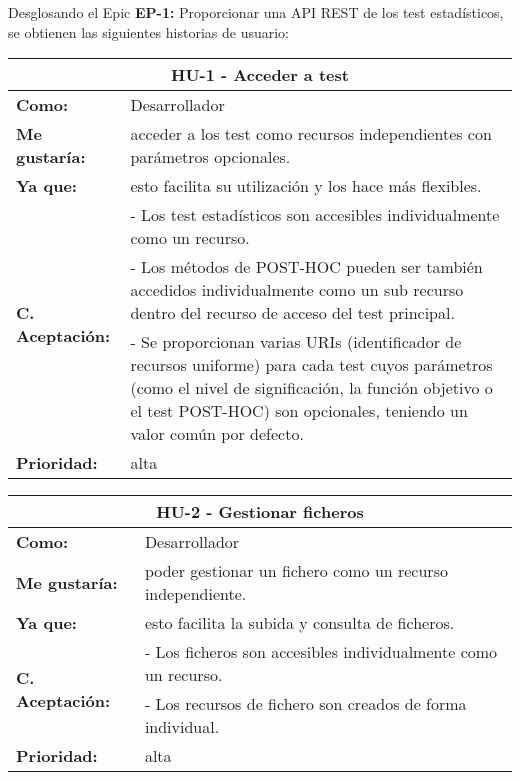 Desglosando el Epic \textbf{EP-1:} Proporcionar una API REST de los test estadísticos, se obtienen las siguientes historias de usuario:

\begin{table}[H]
	\begin{tabular}{| p{3cm}| p{11cm} |}
		\hline
		\multicolumn{2}{|c|}{\textbf{HU-1} - Acceder a test} \\ \hline
		\textbf{Como:} & Desarrollador \\ \hline
		\textbf{Me gustaría:} & acceder a los test como recursos independientes con parámetros opcionales. \\ \hline
		\textbf{Ya que:} & esto facilita su utilización y los hace más flexibles. \\ \hline
		\multirow{3}{11cm}{\textbf{C. Aceptación:}} & - Los test estadísticos son accesibles individualmente como un recurso. \\
		& - Los métodos de POST-HOC pueden ser también accedidos individualmente como un sub recurso dentro del recurso de acceso del test principal. \\
		& - Se proporcionan varias URIs (identificador de recursos uniforme) para cada test cuyos parámetros (como el nivel de significación, la función objetivo o el test POST-HOC) son opcionales, teniendo un valor común por defecto. \\ \hline
		\textbf{\textbf{Prioridad:}} & alta \\ \hline
	\end{tabular}
\end{table}


\begin{table}[H]
	\begin{tabular}{| p{3cm}| p{11cm} |}
		\hline
		\multicolumn{2}{|c|}{\textbf{HU-2} - Gestionar ficheros} \\ \hline
		\textbf{Como:} & Desarrollador \\ \hline
		\textbf{Me gustaría:} & poder gestionar un fichero como un recurso independiente. \\ \hline
		\textbf{Ya que:} & esto facilita la subida y consulta de ficheros. \\ \hline
		\multirow{2}{11cm}{\textbf{C. Aceptación:}} & - Los ficheros son accesibles individualmente como un recurso. \\
		& - Los recursos de fichero son creados de forma individual. \\ \hline 
		\textbf{\textbf{Prioridad:}} & alta \\ \hline
	\end{tabular}
\end{table}
	
